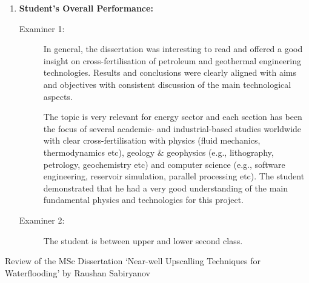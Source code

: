 \documentclass[14pt,twoside]{report}
\begin{document}
\begin{enumerate}
%
    \item {\bf Student's Overall Performance:}
        \begin{description}
            \item[Examiner 1:] In general, the dissertation was interesting to read and offered a good insight on cross-fertilisation of petroleum and geothermal engineering technologies. Results and conclusions were clearly aligned with aims and objectives with consistent discussion of the main technological aspects. 

The topic is very relevant for energy sector and each section has been the focus of several academic- and industrial-based studies worldwide with clear cross-fertilisation with physics (fluid mechanics, thermodynamics etc), geology $\&$ geophysics (e.g., lithography, petrology, geochemistry etc) and computer science (e.g., software engineering, reservoir simulation, parallel processing etc). The student demonstrated that he had a very good understanding of the main fundamental physics and technologies for this project.
            \item[Examiner 2:] The student is between upper and lower second class.
        \end{description}
%
\end{enumerate}

\clearpage


\bigskip

\begin{center}
{\Large Review of the MSc Dissertation `Near-well Upscalling Techniques for Waterflooding' by Raushan Sabiryanov}
\end{center}
\end{document}
